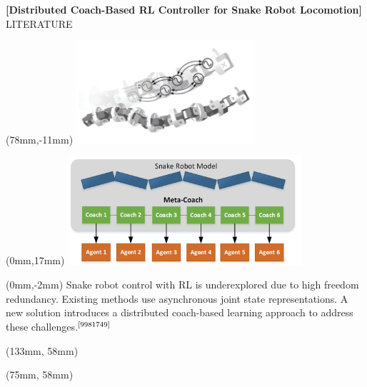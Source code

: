 \documentclass[11pt,aspectratio=169]{beamer}
\begin{document}
\begin{frame}[fragile]{\fontsize{10}{10}\selectfont\textbf{[Distributed Coach-Based RL Controller for Snake Robot Locomotion]} \hfill \fontsize{8}{8}\selectfont LITERATURE \newline [2022]}


        \begin{textblock*}{5cm}(78mm,-11mm) %
        \includegraphics[height=38mm,angle=50,origin=c]{elements/[13]-Snake.png}
        \end{textblock*}
        
        \begin{textblock*}{5cm}(0mm,17mm) %
        \includegraphics[height=40mm]{elements/[12]-Snake.png}
        \end{textblock*}

        \begin{textblock*}{87mm}(0mm,-2mm)
        Snake robot control with RL is underexplored due to high freedom redundancy. Existing methods use asynchronous joint state representations. A new solution introduces a distributed coach-based learning approach to address these challenges.$^{\text{\cite{9981749}}}$
        \end{textblock*}

        \begin{textblock*}{5cm}(133mm, 58mm) %
        {\tiny \cite{9517436}}
        \end{textblock*}

        \begin{textblock*}{5cm}(75mm, 58mm) %
        {\tiny \cite{9981749}}
        \end{textblock*}
        
        \vspace{52mm}
\end{frame}
\end{document}
